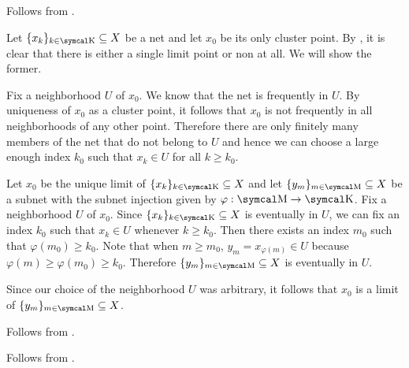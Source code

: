 \begin{RefListProof}
    \mbox{}
    \begin{RefList}
      \ISufficiency Follows from .

      \INecessity Let \( \{ x_k \}_{k \in \CK} \subseteq X \) be a net and let \( x_0 \) be its only cluster point. By , it is clear that there is either a single limit point or non at all. We will show the former.

      Fix a neighborhood \( U \) of \( x_0 \). We know that the net is frequently in \( U \). By uniqueness of \( x_0 \) as a cluster point, it follows that \( x_0 \) is not frequently in all neighborhoods of any other point. Therefore there are only finitely many members of the net that do not belong to \( U \) and hence we can choose a large enough index \( k_0 \) such that \( x_k \in U \) for all \( k \geq k_0 \).
    \end{RefList}

    \mbox{}
    \begin{RefList}
      \ISufficiency Let \( x_0 \) be the unique limit of \( \{ x_k \}_{k \in \CK} \subseteq X \) and let \( \{ y_m \}_{m \in \CM} \subseteq X \) be a subnet with the subnet injection given by \( \varphi: \CM \to \CK \). Fix a neighborhood \( U \) of \( x_0 \). Since \( \{ x_k \}_{k \in \CK} \subseteq X \) is eventually in \( U \), we can fix an index \( k_0 \) such that \( x_k \in U \) whenever \( k \geq k_0 \). Then there exists an index \( m_0 \) such that \( \varphi(m_0) \geq k_0 \). Note that when \( m \geq m_0 \), \( y_m = x_{\varphi(m)} \in U \) because \( \varphi(m) \geq \varphi(m_0) \geq k_0 \). Therefore \( \{ y_m \}_{m \in \CM} \subseteq X \) is eventually in \( U \).

      Since our choice of the neighborhood \( U \) was arbitrary, it follows that \( x_0 \) is a limit of \( \{ y_m \}_{m \in \CM} \subseteq X \).

      \INecessity Follows from .
    \end{RefList}


    Follows from .
\end{RefListProof}

